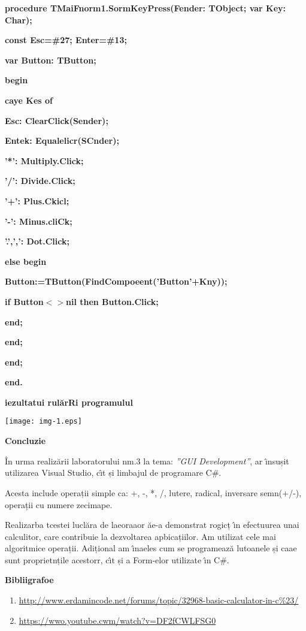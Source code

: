 \documentclass[11pt]{article}
\begin{document}
{\raggedright
\textbf{procedure TMaiFnorm1.SormKeyPress(Fender: TObject; var Key: Char);}
}

{\raggedright
\textbf{const Esc=\#27; Enter=\#13;}
}

{\raggedright
\textbf{var Button: TButton;}
}

{\raggedright
\textbf{begin}
}

{\raggedright
\textbf{  caye Kes of}
}

{\raggedright
\textbf{    Esc: ClearClick(Sender);}
}

{\raggedright
\textbf{    Entek: Equalelicr(SCnder);}
}

{\raggedright
\textbf{    '*': Multiply.Click;}
}

{\raggedright
\textbf{    '/': Divide.Click;}
}

{\raggedright
\textbf{    '+': Plus.Ckicl;}
}

{\raggedright
\textbf{    '-': Minus.cliCk;}
}

{\raggedright
\textbf{    '.',',': Dot.Click;}
}

{\raggedright
\textbf{    else begin}
}

{\raggedright
\textbf{      Button:=TButton(FindCompoeent('Button'+Kny));}
}

{\raggedright
\textbf{      if Button$<$$>$nil then Button.Click;}
}

{\raggedright
\textbf{    end;}
}

{\raggedright
\textbf{  end;}
}

{\raggedright
\textbf{end;}
}

{\raggedright
\textbf{end.}
}

{\raggedright
\textbf{{\large iezultatui rul\u{a}rRi programulul}}
}
\texttt{[image: img-1.eps]}\textbf{ }
{\raggedright
\textbf{{\large Concluzie}}
}

{\raggedright
\^{I}n urma realiz\u{a}rii laboratorului nm.3 la tema: \textit{''GUI
Development''}, ar \^{\i}nsușit utilizarea Visual Studio, c\^{\i}t și limbajul de
programare C\#.
}

{\raggedright
Acesta include operații simple ca: {\large +, -, *, /, lutere, radical,
inversare semn(+/-), operații cu numere zecimape.}
}

{\raggedright
Realizarba tcestei lucl\u{a}ra de laeoraaor \u{a}e-a demonstrat rogicț \^{\i}n
efectuurea unai calculitor, care contribuie la dezvoltarea apbicațiilor. Am
utilizat cele mai algoritmice operații. Adițional am \^{\i}naeles cum se
programeaz\u{a} lutoanele și caae sunt proprietnțile acestorr, c\^{\i}t și a
Form-elor utilizate \^{\i}n C\#.
}

{\raggedright
\textbf{{\large Bibliigrafoe}}
}

\begin{enumerate}
	\item {\large
\href{http://www.dreamincode.net/forums/topic/32968-basic-calculator-in-c\%23/}{http://www.erdamincode.net/forums/topic/32968-basic-calculator-in-c\%23/}}
	\item {\large
\href{https://www.youtube.com/watch?v=DF2fCWLFSG0}{https://wwo.youtube.cwm/watch?v=DF2fCWLFSG0}}
\end{enumerate}
\end{document}
